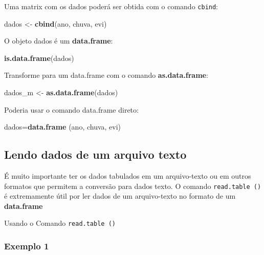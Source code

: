 \documentclass[
]{book}
\newenvironment{Shaded}{\begin{snugshade}}{\end{snugshade}}
\newcommand{\KeywordTok}[1]{\textcolor[rgb]{0.13,0.29,0.53}{\textbf{#1}}}
\newcommand{\NormalTok}[1]{#1}
\newcommand{\StringTok}[1]{\textcolor[rgb]{0.31,0.60,0.02}{#1}}
\begin{document}
Uma matrix com os dados poderá ser obtida com o comando \texttt{cbind}:

\begin{Shaded}
\begin{Highlighting}[]
\NormalTok{dados <-}\StringTok{ }\KeywordTok{cbind}\NormalTok{(ano, chuva, evi)}
\end{Highlighting}
\end{Shaded}

O objeto dados é um \textbf{data.frame}:

\begin{Shaded}
\begin{Highlighting}[]
\KeywordTok{is.data.frame}\NormalTok{(dados)}
\end{Highlighting}
\end{Shaded}

Transforme para um data.frame com o comando \textbf{as.data.frame}:

\begin{Shaded}
\begin{Highlighting}[]
\NormalTok{dados_m <-}\StringTok{ }\KeywordTok{as.data.frame}\NormalTok{(dados)}
\end{Highlighting}
\end{Shaded}

Poderia usar o comando data.frame direto:

\begin{Shaded}
\begin{Highlighting}[]
\NormalTok{dados=}\KeywordTok{data.frame}\NormalTok{ (ano, chuva, evi)}
\end{Highlighting}
\end{Shaded}

\hypertarget{lendo-dados-de-um-arquivo-texto}{%
\subsection{Lendo dados de um arquivo texto}\label{lendo-dados-de-um-arquivo-texto}}

É muito importante ter os dados tabulados em um arquivo-texto ou em outros formatos que permitem a conversão para dados texto. O comando \texttt{read.table\ ()} é extremamente útil por ler dados de um arquivo-texto no formato de um \textbf{data.frame}

Usando o Comando \texttt{read.table\ ()}

\hypertarget{exemplo-1-1}{%
\subsubsection{Exemplo 1}\label{exemplo-1-1}}
\end{document}
